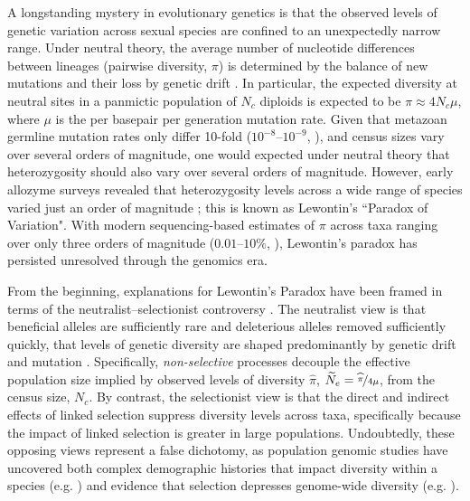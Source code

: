 \documentclass[9pt,lineno]{elife}
\begin{document}
A longstanding mystery in evolutionary genetics is that the observed levels of
genetic variation across sexual species are confined to an unexpectedly narrow
range. Under neutral theory, the average number of nucleotide differences
between lineages (pairwise diversity, $\pi$) is determined by the balance of
new mutations and their loss by genetic drift
\citep{Kimura1964-ul,Malecot1948-zv,Wright1931-fl}. In particular, the expected
diversity at neutral sites in a panmictic population of $N_c$ diploids is
expected to be $\pi \approx 4N_c \mu$, where $\mu$ is the per basepair per
generation mutation rate. Given that metazoan germline mutation rates only
differ 10-fold ($10^{-8}$--$10^{-9}$, \cite{Kondrashov2010-fi,Lynch2010-ki}),
and census sizes vary over several orders of magnitude, one would expected
under neutral theory that heterozygosity should also vary over several orders
of magnitude. However, early allozyme surveys revealed that heterozygosity
levels across a wide range of species varied just an order of magnitude
\citep[][p. 208]{Lewontin1974-jb}; this is known as Lewontin's ``Paradox of
Variation". With modern sequencing-based estimates of $\pi$ across taxa
ranging over only three orders of magnitude ($0.01$--$10\%$,
\cite{Leffler2012-zj}), Lewontin's paradox has persisted unresolved through the
genomics era.

From the beginning, explanations for Lewontin's Paradox have been framed in
terms of the neutralist--selectionist controversy
\citep{Lewontin1974-jb,Kimura1984-ia,Gillespie1991-qa,Gillespie2001-mv}.
The neutralist view is that beneficial alleles are sufficiently rare and
deleterious alleles removed sufficiently quickly, that levels of genetic
diversity are shaped predominantly by genetic drift and mutation
\citep{Kimura1984-ia}. Specifically, \emph{non-selective} processes
decouple the effective population size implied by observed levels of diversity
$\widehat{\pi}$, $\widetilde{N}_e = \nicefrac{\widehat{\pi}}{4\mu}$, from the
census size, $N_c$. By contrast, the selectionist view is that the direct and
indirect effects of linked selection suppress diversity levels across taxa,
specifically because the impact of linked selection is greater in large
populations. Undoubtedly, these opposing views represent a false dichotomy, as
population genomic studies have uncovered both complex demographic histories
that impact diversity within a species (e.g.
\cite{Zhao2013-vd,Palkopoulou2015-bg}) and evidence that selection depresses
genome-wide diversity (e.g.
\cite{Elyashiv2016-vt,Begun1992-ey,Aguade1989-jx,McVicker2009-ax}). 
\end{document}
